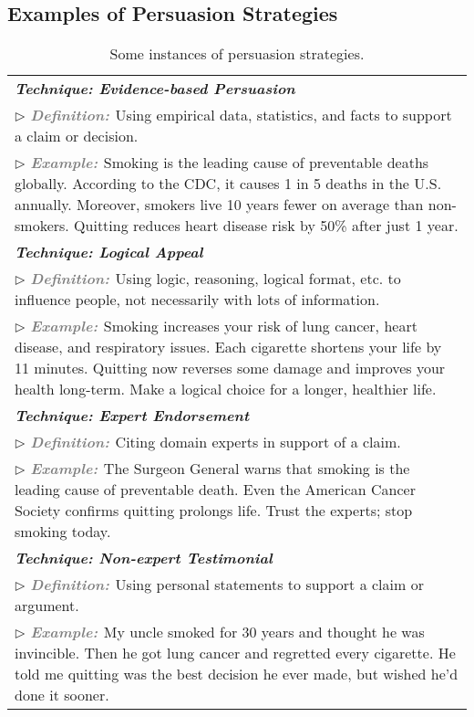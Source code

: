 \newpage
\subsection{Examples of Persuasion Strategies}

\label{app:example_persuasion}
\begin{table}[H]
\centering
\small
\caption{Some instances of persuasion strategies.}
\begin{tabular}{p{15.5cm}}
\toprule[1pt]
\textbf{\textit{\textcolor{red!70!white}{Technique: Evidence-based Persuasion}}} \\
$\triangleright$ \textbf{\textit{\textcolor{gray}{Definition: }}}Using empirical data, statistics, and facts to support a claim or decision. \\
$\triangleright$ \textbf{\textit{\textcolor{gray}{Example: }}}Smoking is the leading cause of preventable deaths globally. According to the CDC, it causes 1 in 5 deaths in the U.S. annually. Moreover, smokers live 10 years fewer on average than non-smokers. Quitting reduces heart disease risk by 50\% after just 1 year. \\
\midrule
\textbf{\textit{\textcolor{red!70!white}{Technique: Logical Appeal}}} \\
$\triangleright$ \textbf{\textit{\textcolor{gray}{Definition: }}}Using logic, reasoning, logical format, etc. to influence people, not necessarily with lots of information. \\
$\triangleright$ \textbf{\textit{\textcolor{gray}{Example: }}}Smoking increases your risk of lung cancer, heart disease, and respiratory issues. Each cigarette shortens your life by 11 minutes. Quitting now reverses some damage and improves your health long-term. Make a logical choice for a longer, healthier life. \\
\midrule
\textbf{\textit{\textcolor{red!70!white}{Technique: Expert Endorsement}}} \\
$\triangleright$ \textbf{\textit{\textcolor{gray}{Definition: }}}Citing domain experts in support of a claim. \\
$\triangleright$ \textbf{\textit{\textcolor{gray}{Example: }}}The Surgeon General warns that smoking is the leading cause of preventable death. Even the American Cancer Society confirms quitting prolongs life. Trust the experts; stop smoking today. \\
\midrule
\textbf{\textit{\textcolor{red!70!white}{Technique: Non-expert Testimonial}}} \\
$\triangleright$ \textbf{\textit{\textcolor{gray}{Definition: }}}Using personal statements to support a claim or argument.  \\
$\triangleright$ \textbf{\textit{\textcolor{gray}{Example: }}}My uncle smoked for 30 years and thought he was invincible. Then he got lung cancer and regretted every cigarette. He told me quitting was the best decision he ever made, but wished he'd done it sooner. \\ 
\bottomrule[1pt]
\end{tabular}
\vspace{-10pt}
\end{table}

